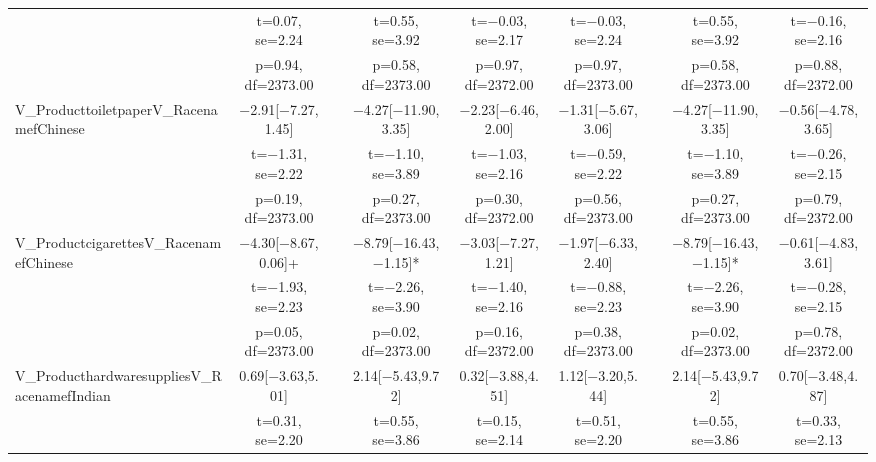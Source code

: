 \documentclass[]{report}
\begin{document}
\begin{table}
{\begin{tabular}[t]{lcccccccc}
		& t=\num{0.07}, se=\num{2.24} &  & t=\num{0.55}, se=\num{3.92} & t=\num{-0.03}, se=\num{2.17} & t=\num{-0.03}, se=\num{2.24} &  & t=\num{0.55}, se=\num{3.92} & t=\num{-0.16}, se=\num{2.16}\\
		& p=\num{0.94}, df=\num{2373.00} &  & p=\num{0.58}, df=\num{2373.00} & p=\num{0.97}, df=\num{2372.00} & p=\num{0.97}, df=\num{2373.00} &  & p=\num{0.58}, df=\num{2373.00} & p=\num{0.88}, df=\num{2372.00}\\
		V\_ProducttoiletpaperV\_RacenamefChinese & \num{-2.91}[\num{-7.27},\num{1.45}] &  & \num{-4.27}[\num{-11.90},\num{3.35}] & \num{-2.23}[\num{-6.46},\num{2.00}] & \num{-1.31}[\num{-5.67},\num{3.06}] &  & \num{-4.27}[\num{-11.90},\num{3.35}] & \num{-0.56}[\num{-4.78},\num{3.65}]\\
		& t=\num{-1.31}, se=\num{2.22} &  & t=\num{-1.10}, se=\num{3.89} & t=\num{-1.03}, se=\num{2.16} & t=\num{-0.59}, se=\num{2.22} &  & t=\num{-1.10}, se=\num{3.89} & t=\num{-0.26}, se=\num{2.15}\\
		& p=\num{0.19}, df=\num{2373.00} &  & p=\num{0.27}, df=\num{2373.00} & p=\num{0.30}, df=\num{2372.00} & p=\num{0.56}, df=\num{2373.00} &  & p=\num{0.27}, df=\num{2373.00} & p=\num{0.79}, df=\num{2372.00}\\
		V\_ProductcigarettesV\_RacenamefChinese & \num{-4.30}[\num{-8.67},\num{0.06}]+ &  & \num{-8.79}[\num{-16.43},\num{-1.15}]* & \num{-3.03}[\num{-7.27},\num{1.21}] & \num{-1.97}[\num{-6.33},\num{2.40}] &  & \num{-8.79}[\num{-16.43},\num{-1.15}]* & \num{-0.61}[\num{-4.83},\num{3.61}]\\
		& t=\num{-1.93}, se=\num{2.23} &  & t=\num{-2.26}, se=\num{3.90} & t=\num{-1.40}, se=\num{2.16} & t=\num{-0.88}, se=\num{2.23} &  & t=\num{-2.26}, se=\num{3.90} & t=\num{-0.28}, se=\num{2.15}\\
		& p=\num{0.05}, df=\num{2373.00} &  & p=\num{0.02}, df=\num{2373.00} & p=\num{0.16}, df=\num{2372.00} & p=\num{0.38}, df=\num{2373.00} &  & p=\num{0.02}, df=\num{2373.00} & p=\num{0.78}, df=\num{2372.00}\\
		V\_ProducthardwaresuppliesV\_RacenamefIndian & \num{0.69}[\num{-3.63},\num{5.01}] &  & \num{2.14}[\num{-5.43},\num{9.72}] & \num{0.32}[\num{-3.88},\num{4.51}] & \num{1.12}[\num{-3.20},\num{5.44}] &  & \num{2.14}[\num{-5.43},\num{9.72}] & \num{0.70}[\num{-3.48},\num{4.87}]\\
		& t=\num{0.31}, se=\num{2.20} &  & t=\num{0.55}, se=\num{3.86} & t=\num{0.15}, se=\num{2.14} & t=\num{0.51}, se=\num{2.20} &  & t=\num{0.55}, se=\num{3.86} & t=\num{0.33}, se=\num{2.13}\\

\end{tabular}}
\end{table}
\end{document}

